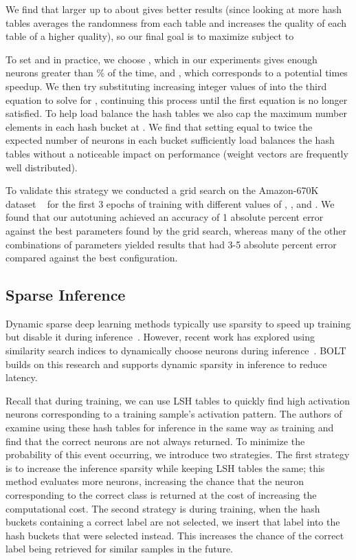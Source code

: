 \documentclass[sigconf]{acmart}
\begin{document}
We find that larger  up to about  gives better results (since looking at more hash tables averages the randomness from each table and increases the quality of each table of a higher quality), so our final goal is to maximize  subject to 

To set  and  in practice, we choose , which in our experiments gives enough neurons greater than \% of the time, and , which corresponds to a potential  times speedup. We then try substituting increasing integer values of  into the third equation to solve for , continuing this process until the first equation is no longer satisfied. To help load balance the hash tables we also cap the maximum number elements in each hash bucket at . We find that setting  equal to twice the expected number of neurons in each bucket sufficiently load balances the hash tables without a noticeable impact on performance (weight vectors are frequently well distributed).


To validate this strategy we conducted a grid search on the Amazon-670K dataset ~\cite{Bhatia16} for the first 3 epochs of training with different values of , , and . We found that our autotuning achieved an accuracy of 1 absolute percent error against the best parameters found by the grid search, whereas many of the other combinations of parameters yielded results that had 3-5 absolute percent error compared against the best configuration.







\subsection{Sparse Inference}

Dynamic sparse deep learning methods typically use sparsity to speed up training but disable it during inference~\cite{chen2020slide, chen2020mongoose}. However, recent work has explored using similarity search indices to dynamically choose neurons during inference~\cite{liu2020climbing}. BOLT builds on this research and supports dynamic sparsity in inference to reduce latency.

Recall that during training, we can use LSH tables to quickly find high activation neurons corresponding to a training sample's activation pattern. The authors of ~\cite{liu2020climbing} examine using these hash tables for inference in the same way as training and find that the correct neurons are not always returned. To minimize the probability of this event occurring, we introduce two strategies. The first strategy is to increase the inference sparsity while keeping LSH tables the same; this method evaluates more neurons, increasing the chance that the neuron corresponding to the correct class is returned at the cost of increasing the computational cost. The second strategy is during training, when the hash buckets containing a correct label are not selected, we insert that label into the hash buckets that were selected instead. This increases the chance of the correct label being retrieved for similar samples in the future.
\end{document}
